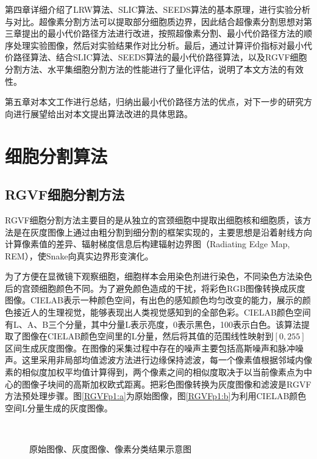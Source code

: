 \documentclass[nomlist,masters]{seuthesix}
\begin{document}
第四章详细介绍了LRW算法、SLIC算法、SEEDS算法的基本原理，进行实验分析与对比。超像素分割方法可以提取部分细胞质边界，因此结合超像素分割思想对第三章提出的最小代价路径方法进行改进，按照超像素分割、最小代价路径方法的顺序处理实验图像，然后对实验结果作对比分析。最后，通过计算评价指标对最小代价路径算法、结合SLIC算法、SEEDS算法的最小代价路径算法，以及RGVF细胞分割方法、水平集细胞分割方法的性能进行了量化评估，说明了本文方法的有效性。

第五章对本文工作进行总结，归纳出最小代价路径方法的优点，对下一步的研究方向进行展望给出对本文提出算法改进的具体思路。

\chapter{细胞分割算法}  
\section{RGVF细胞分割方法}  
RGVF细胞分割方法\cite{Li2012Cytoplasm}主要目的是从独立的宫颈细胞中提取出细胞核和细胞质，该方法是在灰度图像上通过由粗分割到细分割的框架实现的，主要思想是沿着射线方向计算像素值的差异、辐射梯度信息后构建辐射边界图（Radiating Edge Map, REM），使Snake向真实边界形变演化。

为了方便在显微镜下观察细胞，细胞样本会用染色剂进行染色，不同染色方法染色后的宫颈细胞颜色不同。为了避免颜色造成的干扰，将彩色RGB图像转换成灰度图像。CIELAB表示一种颜色空间，有出色的感知颜色均匀改变的能力，展示的颜色接近人的生理视觉，能够表现出人类视觉感知到的全部色彩。CIELAB颜色空间有L、A、B三个分量，其中分量L表示亮度，0表示黑色，100表示白色。该算法提取了图像在CIELAB颜色空间里的L分量，然后将其值的范围线性映射到$[0,255]$区间生成灰度图像。在图像的采集过程中存在的噪声主要包括高斯噪声和脉冲噪声。这里采用非局部均值滤波方法进行边缘保持滤波，每一个像素值根据邻域内像素的相似度加权平均值计算得到，两个像素之间的相似度取决于以当前像素点为中心的图像子块间的高斯加权欧式距离。把彩色图像转换为灰度图像和滤波是RGVF方法预处理步骤。图\ref{RGVFp1:a}为原始图像，图\ref{RGVFp1:b}为利用CIELAB颜色空间L分量生成的灰度图像。

\begin{figure}[H]
\centering 
\hspace{0.01\textwidth}
\hspace{0.01\textwidth}
\caption{原始图像、灰度图像、像素分类结果示意图}
\label{RGVFp1}
\end{figure}
\end{document}
